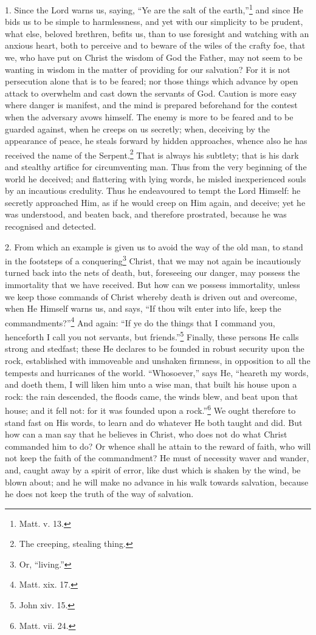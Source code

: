 1. Since the Lord warns us, saying, “Ye are the salt of the earth,”\footnote{Matt. v. 13.} and since He bids us to be simple to harmlessness, and yet with our simplicity to be prudent, what else, beloved brethren, befits us, than to use foresight and watching with an anxious heart, both to perceive and to beware of the wiles of the crafty foe, that we, who have put on Christ the wisdom of God the Father, may not seem to be wanting in wisdom in the matter of providing for our salvation? For it is not persecution alone that is to be feared; nor those things which advance by open attack to overwhelm and cast down the servants of God. Caution is more easy where danger is manifest, and the mind is prepared beforehand for the contest when the adversary avows himself. The enemy is more to be feared and to be guarded against, when he creeps on us secretly; when, deceiving by the appearance of peace, he steals forward by hidden approaches, whence also he has received the name of the Serpent.\footnote{The creeping, stealing thing.} That is always his subtlety; that is his dark and stealthy artifice for circumventing man. Thus from the very beginning of the world he deceived; and flattering with lying words, he misled inexperienced souls by an incautious credulity. Thus he endeavoured to tempt the Lord Himself: he secretly approached Him, as if he would creep on Him again, and deceive; yet he was understood, and beaten back, and therefore prostrated, because he was recognised and detected.

2. From which an example is given us to avoid the way of the old man, to stand in the footsteps of a conquering\footnote{Or, “living.”} Christ, that we may not again be incautiously turned back into the nets of death, but, foreseeing our danger, may possess the immortality that we have received. But how can we possess immortality, unless we keep those commands of Christ whereby death is driven out and overcome, when He Himself warns us, and says, “If thou wilt enter into life, keep the commandments?”\footnote{Matt. xix. 17.} And again: “If ye do the things that I command you, henceforth I call you not servants, but friends.”\footnote{John xiv. 15.} Finally, these persons He calls strong and stedfast; these He declares to be founded in robust security upon the rock, established with immoveable and unshaken firmness, in opposition to all the tempests and hurricanes of the world. “Whosoever,” says He, “heareth my words, and doeth them, I will liken him unto a wise man, that built his house upon a rock: the rain descended, the floods came, the winds blew, and beat upon that house; and it fell not: for it was founded upon a rock.”\footnote{Matt. vii. 24.} We ought therefore to stand fast on His words, to learn and do whatever He both taught and did. But how can a man say that he believes in Christ, who does not do what Christ commanded him to do? Or whence shall he attain to the reward of faith, who will not keep the faith of the commandment? He must of necessity waver and wander, and, caught away by a spirit of error, like dust which is shaken by the wind, be blown about; and he will make no advance in his walk towards salvation, because he does not keep the truth of the way of salvation.

